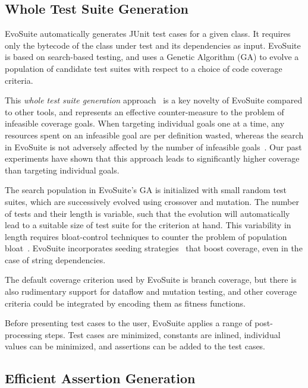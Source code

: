 \documentclass[10pt,conference,compsocconf]{IEEEtran}
\newcommand{\EVOSUITE}{{\sc EvoSuite}\xspace}
\begin{document}
\subsection{Whole Test Suite Generation}

\EVOSUITE automatically generates JUnit test cases for a given
class. It requires only the bytecode of the class under test and its
dependencies as input. \EVOSUITE is based on search-based testing, and
uses a Genetic Algorithm (GA) to evolve a population of candidate test
suites with respect to a choice of code coverage criteria. 

This \emph{whole test suite generation} approach~\cite{GoA_TSE12} is a
key novelty of \EVOSUITE compared to other tools, and represents an
effective counter-measure to the problem of infeasible coverage
goals. When targeting individual goals one at a time, any resources
spent on an infeasible goal are per definition wasted, whereas the
search in \EVOSUITE is not adversely affected by the number of
infeasible goals~\cite{GoA_TSE12}. Our past experiments have shown
that this approach leads to significantly higher coverage than
targeting individual goals.


The search population in \EVOSUITE's GA is initialized with small
random test suites, which are successively evolved using crossover and
mutation. The number of tests and their length is variable, such that
the evolution will automatically lead to a suitable size of test suite
for the criterion at hand. This variability in length requires
bloat-control techniques to counter the problem of population
bloat~\cite{GoA11}. \EVOSUITE incorporates seeding
strategies~\cite{FrA12a} that boost coverage, even in the case of string
dependencies.

The default coverage criterion used by \EVOSUITE is branch coverage,
but there is also rudimentary support for dataflow and mutation
testing, and other coverage criteria could be integrated by encoding
them as fitness functions.

Before presenting test cases to the user, \EVOSUITE applies a range of
post-processing steps. Test cases are minimized, constants are
inlined, individual values can be minimized, and assertions can be
added to the test cases.


\subsection{Efficient Assertion Generation}
\end{document}
